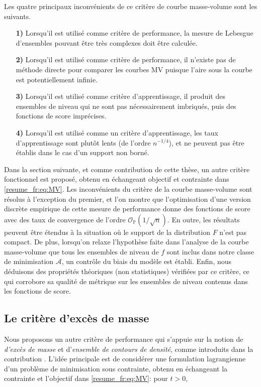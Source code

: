 Les quatre principaux inconvénients de ce critère de courbe masse-volume sont les suivants.

\begin{itemize}
\item[\textbf{1)}] Lorsqu'il est utilisé comme critère de performance, la mesure de Lebesgue d'ensembles pouvant être très complexes doit être calculée.
\item[\textbf{2)}] Lorsqu'il est utilisé comme critère de performance, il n'existe pas de méthode directe pour comparer les courbes MV puisque l'aire sous la courbe est potentiellement infinie.
\item[\textbf{3)}] Lorsqu'il est utilisé comme critère d'apprentissage, il produit des ensembles de niveau qui ne sont pas nécessairement imbriqués, puis des fonctions de score imprécises.
\item[\textbf{4)}] Lorsqu'il est utilisé comme un critère d'apprentissage, les taux d'apprentissage sont plutôt lents (de l'ordre $ n ^ {- 1/4} $), et ne peuvent pas être établis dans le cas d'un support non borné.
\end{itemize}




Dans la section suivante, et comme contribution de cette thèse, un autre critère fonctionnel est proposé, obtenu en échangeant objectif et contrainte dans \eqref{resume_fr:eq:MV}. Les inconvénients du critère de la courbe masse-volume sont résolus à l'exception du premier, et l'on montre que l'optimisation d'une version discrète empirique de cette mesure de performance donne des fonctions de score avec des taux de convergence de l'ordre $ \mathcal {O} _ {\mathbb {P}} (1 / \sqrt {n}) $. En outre, les résultats peuvent être étendus à la situation où le support de la distribution $ F $ n'est pas compact. De plus, lorsqu'on relaxe l'hypothèse faite dans l'analyse de la courbe masse-volume que tous les ensembles de niveau de $f$ sont inclus dans notre classe de minimisation $ \mathcal {A} $, un contrôle du biais du modèle est établi. Enfin, nous déduisons des propriétés théoriques (non statistiques) vérifiées par ce critère, ce qui corrobore sa qualité de métrique sur les ensembles de niveau contenus dans les fonctions de score.


\subsection{Le critère d'excès de masse}
\label{resume_fr:em-curve}
Nous proposons un autre critère de performance qui s'appuie sur la notion de \textit {d'excès de masse} et d'\textit{ensemble de contours de densité}, comme introduits dans la contribution \cite{Polonik95}. L'idée principale est de considérer une formulation lagrangienne d'un problème de minimisation sous contrainte, obtenu en échangeant la contrainte et l'objectif dans \eqref{resume_fr:eq:MV}: pour $ t> 0 $,

